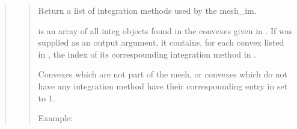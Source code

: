 \documentclass[a4paper,11pt,english]{sphinxmanual}
\begin{document}
\begin{quote}

\begin{quote}

Return a list of integration methods used by the mesh\_im.

 is an array of all integ objects found in the convexes
given in . If  was supplied as an output argument, it
contains, for each convex listed in , the index of its
correspounding integration method in .

Convexes which are not part of the mesh, or convexes which do
not have any integration method have their correspounding entry
in  set to \sphinxhyphen{}1.

Example:

\begin{sphinxVerbatim}[commandchars=\\\{\}]
\PYG{p}{[}\PYG{p}{]} 
   
 
\end{sphinxVerbatim}
\end{quote}


\end{quote}
\end{document}
